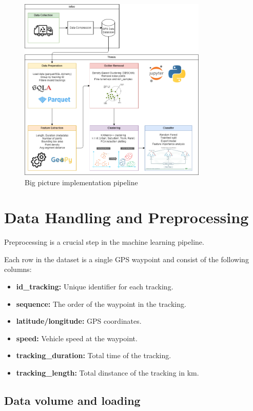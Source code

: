 \documentclass[a4paper,12pt,twoside]{scrreprt}
\begin{document}
\begin{figure}[htbp]
  \centering

  \includegraphics[width=0.8\textwidth]{Diagrams/drawio/big_picture_implementation.png}
  \caption{Big picture implementation pipeline}
  \label{fig:big_picture_implemetation_diagram}
\end{figure}
\FloatBarrier

\section{Data Handling and Preprocessing}
Preprocessing is a crucial step in the machine learning pipeline.

Each row in the dataset is a single GPS waypoint and consist of the following
columns:

\begin{itemize}
  \item \textbf{id\_tracking:} Unique identifier for each tracking.
  \item \textbf{sequence:} The order of the waypoint in the tracking.
  \item \textbf{latitude/longitude:} GPS coordinates.
  \item \textbf{speed:} Vehicle speed at the waypoint.
  \item \textbf{tracking\_duration:} Total time of the tracking.
  \item \textbf{tracking\_length:} Total dinstance of the tracking in km.
\end{itemize}

\subsection{Data volume and loading}
\end{document}

